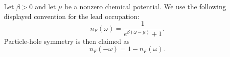 \documentclass{article}
\begin{document}
Let $\beta>0$ and let $\mu$ be a nonzero chemical potential.  We use the
following displayed convention for the lead occupation:
\begin{equation}
n_F(\omega) = \frac{1}{e^{\beta(\omega-\mu)}+1} .
\label{eq:shifted-occupation-definition}
\end{equation}
Particle-hole symmetry is then claimed as
\begin{equation}
n_F(-\omega) = 1-n_F(\omega) .
\label{eq:shifted-occupation-ph}
\end{equation}
\end{document}
